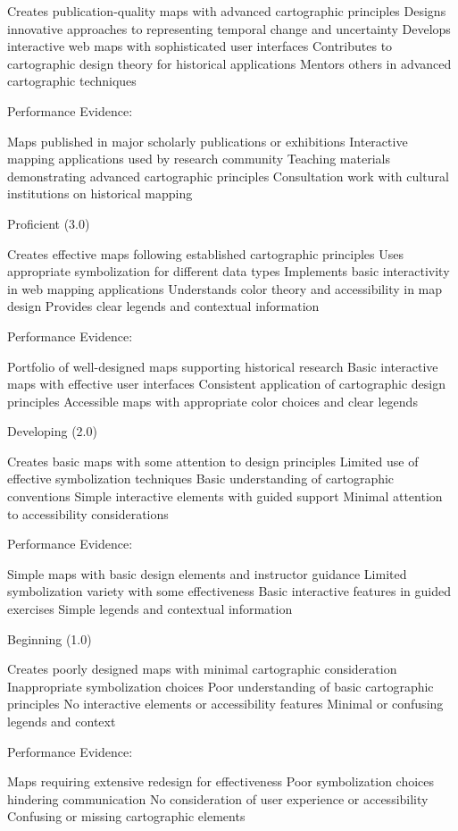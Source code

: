 \begin{appendices}
Creates publication-quality maps with advanced cartographic principles
Designs innovative approaches to representing temporal change and uncertainty
Develops interactive web maps with sophisticated user interfaces
Contributes to cartographic design theory for historical applications
Mentors others in advanced cartographic techniques

Performance Evidence:

Maps published in major scholarly publications or exhibitions
Interactive mapping applications used by research community
Teaching materials demonstrating advanced cartographic principles
Consultation work with cultural institutions on historical mapping

Proficient (3.0)

Creates effective maps following established cartographic principles
Uses appropriate symbolization for different data types
Implements basic interactivity in web mapping applications
Understands color theory and accessibility in map design
Provides clear legends and contextual information

Performance Evidence:

Portfolio of well-designed maps supporting historical research
Basic interactive maps with effective user interfaces
Consistent application of cartographic design principles
Accessible maps with appropriate color choices and clear legends

Developing (2.0)

Creates basic maps with some attention to design principles
Limited use of effective symbolization techniques
Basic understanding of cartographic conventions
Simple interactive elements with guided support
Minimal attention to accessibility considerations

Performance Evidence:

Simple maps with basic design elements and instructor guidance
Limited symbolization variety with some effectiveness
Basic interactive features in guided exercises
Simple legends and contextual information

Beginning (1.0)

Creates poorly designed maps with minimal cartographic consideration
Inappropriate symbolization choices
Poor understanding of basic cartographic principles
No interactive elements or accessibility features
Minimal or confusing legends and context

Performance Evidence:

Maps requiring extensive redesign for effectiveness
Poor symbolization choices hindering communication
No consideration of user experience or accessibility
Confusing or missing cartographic elements



\end{appendices}
